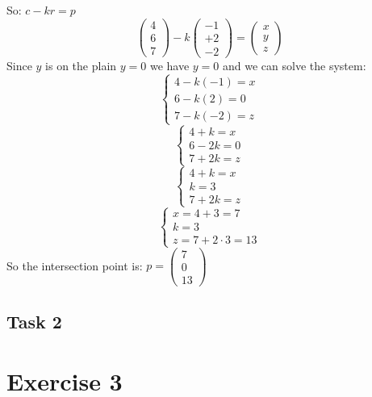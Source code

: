\documentclass[tikz,14pt,fleqn]{article}
\begin{document}
So: $ c - k r = p $
\[
   \begin{pmatrix} 4 \\ 6 \\ 7 \end{pmatrix} - k \begin{pmatrix} -1 \\ +2 \\ -2 \end{pmatrix} = \begin{pmatrix} x \\ y \\ z \end{pmatrix}
\]
Since $y$ is on the plain $y = 0$ we have $y = 0$ and we can solve the system:
\[
   \begin{cases}
      4 - k (-1) = x \\
      6 - k (2) = 0 \\
      7 - k (-2) = z
   \end{cases}
\]
\[
   \begin{cases}
      4 + k = x \\
      6 - 2k = 0 \\
      7 + 2k = z
   \end{cases}
\]
\[
   \begin{cases}
      4 + k = x \\
      k = 3 \\
      7 + 2k = z
   \end{cases}
\]
\[
   \begin{cases}
      x = 4+3=7 \\
      k = 3 \\
      z = 7 + 2 \cdot 3 = 13
   \end{cases}
\]
So the intersection point is: $p = \begin{pmatrix} 7 \\ 0 \\ 13 \end{pmatrix}$


\subsection{Task 2}



\newpage
\section{Exercise 3}
\end{document}
